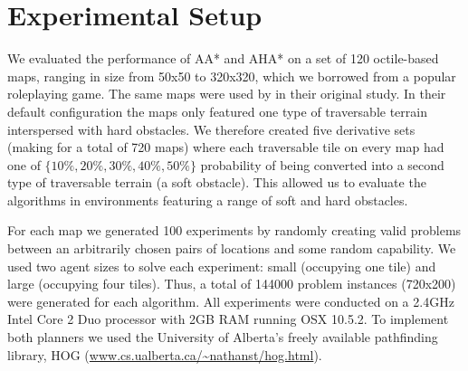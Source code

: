 \section{Experimental Setup}
We evaluated the performance of AA* and AHA* on a set of 120 octile-based maps, ranging in size from 50x50 to 320x320, which we borrowed from a popular roleplaying game.
The same maps were used by \cite{botea04} in their original study.
In their default configuration the maps only featured one type of traversable terrain interspersed with hard obstacles. 
We therefore created five derivative sets (making for a total of 720 maps) where each traversable tile on every map had one of $\lbrace 10\%, 20\%, 30\%, 40\%, 50\% \rbrace$ probability of being converted into a second type of traversable terrain (a soft obstacle). 
This allowed us to evaluate the algorithms in environments featuring a range of soft and hard obstacles.
\par \indent
For each map we generated 100 experiments by randomly creating valid problems between an arbitrarily chosen pairs of locations and some random capability.
We used two agent sizes to solve each experiment: small (occupying one tile) and large (occupying four tiles). 
Thus, a total of 144000 problem instances (720x200) were generated for each algorithm. 
All experiments were conducted on a 2.4GHz Intel Core 2 Duo processor with 2GB RAM running OSX 10.5.2.
To implement both planners we used the University of Alberta's freely available pathfinding library, HOG (\url{www.cs.ualberta.ca/~nathanst/hog.html}). 
